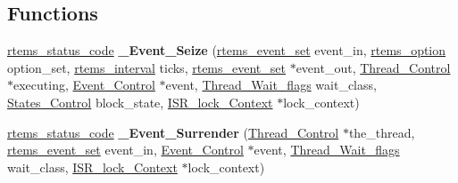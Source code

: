 \subsection*{Functions}
\begin{DoxyCompactItemize}
\item 
\mbox{\label{group__ClassicEventImpl_ga63d82e0e70a4acc2784bb7bc1bba01fb}} 
\mbox{\hyperlink{group__ClassicStatus_ga545d41846817eaba6143d52ee4d9e9fe}{rtems\+\_\+status\+\_\+code}} {\bfseries \+\_\+\+Event\+\_\+\+Seize} (\mbox{\hyperlink{group__ClassicEventSet_gab7b8f373bea85fd4e3b7ae23905faa07}{rtems\+\_\+event\+\_\+set}} event\+\_\+in, \mbox{\hyperlink{group__ClassicOptions_gad26685eb0e60a9650082935c31920e29}{rtems\+\_\+option}} option\+\_\+set, \mbox{\hyperlink{group__ClassicTasks_gad39c43f949683d46874e3a5586b93aee}{rtems\+\_\+interval}} ticks, \mbox{\hyperlink{group__ClassicEventSet_gab7b8f373bea85fd4e3b7ae23905faa07}{rtems\+\_\+event\+\_\+set}} $\ast$event\+\_\+out, \mbox{\hyperlink{struct__Thread__Control}{Thread\+\_\+\+Control}} $\ast$executing, \mbox{\hyperlink{structEvent__Control}{Event\+\_\+\+Control}} $\ast$event, \mbox{\hyperlink{group__RTEMSScoreThread_ga9a047ae9c77bc90a258203d4f2cc57db}{Thread\+\_\+\+Wait\+\_\+flags}} wait\+\_\+class, \mbox{\hyperlink{group__RTEMSScoreStates_gaeebbea0bfca162709b124fd519cf99d3}{States\+\_\+\+Control}} block\+\_\+state, \mbox{\hyperlink{structISR__lock__Context}{I\+S\+R\+\_\+lock\+\_\+\+Context}} $\ast$lock\+\_\+context)
\item 
\mbox{\label{group__ClassicEventImpl_ga6ecbbc770f35aa183650e0e11901efc9}} 
\mbox{\hyperlink{group__ClassicStatus_ga545d41846817eaba6143d52ee4d9e9fe}{rtems\+\_\+status\+\_\+code}} {\bfseries \+\_\+\+Event\+\_\+\+Surrender} (\mbox{\hyperlink{struct__Thread__Control}{Thread\+\_\+\+Control}} $\ast$the\+\_\+thread, \mbox{\hyperlink{group__ClassicEventSet_gab7b8f373bea85fd4e3b7ae23905faa07}{rtems\+\_\+event\+\_\+set}} event\+\_\+in, \mbox{\hyperlink{structEvent__Control}{Event\+\_\+\+Control}} $\ast$event, \mbox{\hyperlink{group__RTEMSScoreThread_ga9a047ae9c77bc90a258203d4f2cc57db}{Thread\+\_\+\+Wait\+\_\+flags}} wait\+\_\+class, \mbox{\hyperlink{structISR__lock__Context}{I\+S\+R\+\_\+lock\+\_\+\+Context}} $\ast$lock\+\_\+context)
\item 
\mbox{\label{group__ClassicEventImpl_ga2d92f9c0f88e1f333eadaa0ab470c1d3}} 

\end{DoxyCompactItemize}
